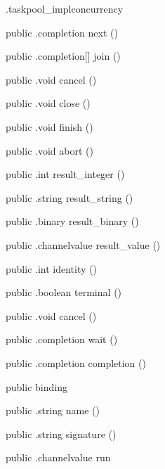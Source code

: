 \begin{CrexxClass}{.taskpool\_impl}{concurrency}
\begin{Members}
    \Method
      {public}
      {.completion}
      {next}
      {()}

    \Method
      {public}
      {.completion[]}
      {join}
      {()}

    \Method
      {public}
      {.void}
      {cancel}
      {()}

    \Method
      {public}
      {.void}
      {close}
      {()}

    \Method
      {public}
      {.void}
      {finish}
      {()}

    \Method
      {public}
      {.void}
      {abort}
      {()}

    \Method
      {public}
      {.int}
      {result\_integer}
      {()}

    \Method
      {public}
      {.string}
      {result\_string}
      {()}

    \Method
      {public}
      {.binary}
      {result\_binary}
      {()}

    \Method
      {public}
      {.channelvalue}
      {result\_value}
      {()}

    \Method
      {public}
      {.int}
      {identity}
      {()}

    \Method
      {public}
      {.boolean}
      {terminal}
      {()}

    \Method
      {public}
      {.void}
      {cancel}
      {()}

    \Method
      {public}
      {.completion}
      {wait}
      {()}

    \Method
      {public}
      {.completion}
      {completion}
      {()}

    \Factory
      {public}
      {binding}
      {}

    \Method
      {public}
      {.string}
      {name}
      {()}

    \Method
      {public}
      {.string}
      {signature}
      {()}

    \Method
      {public}
      {.channelvalue}
      {run}
      {}


\end{Members}
\end{CrexxClass}
